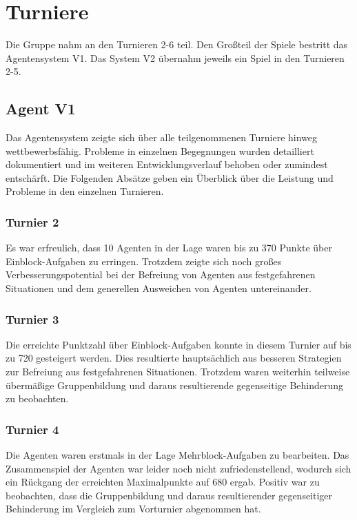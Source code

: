 \documentclass[runningheads]{llncs}
\begin{document}
\section{Turniere}\label{Turniere}
Die Gruppe nahm an den Turnieren 2-6 teil. Den Großteil der Spiele bestritt das Agentensystem V1. Das System V2 übernahm jeweils ein Spiel in den Turnieren 2-5. 

\subsection{Agent V1}
Das Agentensystem zeigte sich über alle teilgenommenen Turniere hinweg wettbewerbsfähig. Probleme in einzelnen Begegnungen wurden detailliert dokumentiert und im weiteren Entwicklungsverlauf behoben oder zumindest entschärft. Die Folgenden Absätze geben ein Überblick über die Leistung und Probleme in den einzelnen Turnieren.

\subsubsection{Turnier 2}
Es war erfreulich, dass 10 Agenten in der Lage waren bis zu 370 Punkte über Einblock-Aufgaben zu erringen. Trotzdem zeigte sich noch großes Verbesserungspotential bei der Befreiung von Agenten aus festgefahrenen Situationen und dem generellen Ausweichen von Agenten untereinander.

\subsubsection{Turnier 3}
Die erreichte Punktzahl über Einblock-Aufgaben konnte in diesem Turnier auf bis zu 720 gesteigert werden. Dies resultierte hauptsächlich aus besseren Strategien zur Befreiung aus festgefahrenen Situationen. Trotzdem waren weiterhin teilweise übermäßige Gruppenbildung und daraus resultierende gegenseitige Behinderung zu beobachten.

\subsubsection{Turnier 4}
Die Agenten waren erstmals in der Lage Mehrblock-Aufgaben zu bearbeiten. Das Zusammenspiel der Agenten war leider noch nicht zufriedenstellend, wodurch sich ein Rückgang der erreichten Maximalpunkte auf 680 ergab. Positiv war zu beobachten, dass die Gruppenbildung und daraus resultierender gegenseitiger Behinderung im Vergleich zum Vorturnier abgenommen hat.
\end{document}
